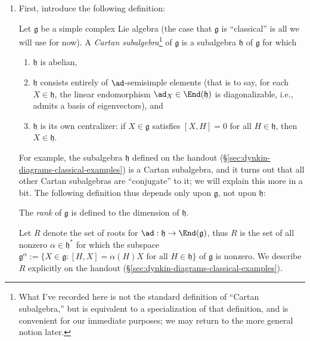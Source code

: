 \documentclass[reqno]{amsart} 
\begin{document}
\begin{enumerate}
\item First, introduce the following definition:
  \begin{definition}\label{defn:cartan-subalgebra-of-simple-lie-algebra}
    Let $\mathfrak{g}$ be a simple complex Lie algebra (the case that $\mathfrak{g}$ is ``classical'' is all we will use for now).  A \emph{Cartan subalgebra}\footnote{ What I've recorded here is not the standard definition of ``Cartan subalgebra,'' but is equivalent to a specialization of that definition, and is convenient for our immediate purposes; we may return to the more general notion later.  } of $\mathfrak{g}$ is a subalgebra $\mathfrak{h}$ of $\mathfrak{g}$ for which
    \begin{enumerate}
    \item $\mathfrak{h}$ is abelian,
    \item $\mathfrak{h}$ consists entirely of $\ad$-semisimple elements (that is to say, for each $X \in \mathfrak{h}$, the linear endomorphism $\ad_X \in \End(\mathfrak{h})$ is diagonalizable, i.e., admits a basis of eigenvectors), and
    \item $\mathfrak{h}$ is its own centralizer: if $X \in \mathfrak{g}$ satisfies $[X,H] = 0$ for all $H \in \mathfrak{h}$, then $X \in \mathfrak{h}$.
    \end{enumerate}
  \end{definition}
  For example, the subalgebra $\mathfrak{h}$ defined on the handout (\S\ref{sec:dynkin-diagrams-classical-examples}) is a Cartan subalgebra, and it turns out that all other Cartan subalgebras are ``conjugate'' to it; we will explain this more in a bit.  The following definition thus depends only upon $\mathfrak{g}$, not upon $\mathfrak{h}$:
  \begin{definition}
    The \emph{rank} of $\mathfrak{g}$ is defined to the dimension of $\mathfrak{h}$.
  \end{definition}

  Let $R$ denote the set of roots for $\ad : \mathfrak{h} \rightarrow \End(\mathfrak{g})$, thus $R$ is the set of all nonzero $\alpha \in \mathfrak{h}^*$ for which the subspace $\mathfrak{g}^\alpha := \{X \in \mathfrak{g} : [H,X] = \alpha(H) X \text{ for all } H \in \mathfrak{h}\}$ of $\mathfrak{g}$ is nonzero.  We describe $R$ explicitly on the handout (\S\ref{sec:dynkin-diagrams-classical-examples}).


\end{enumerate}
\end{document}
